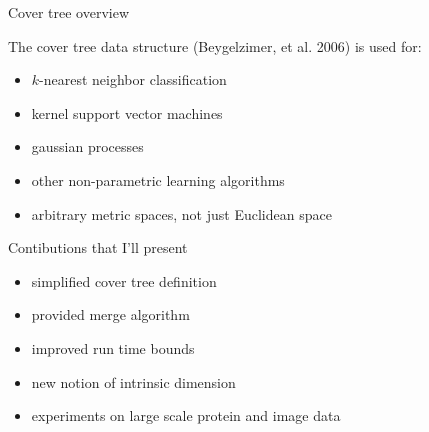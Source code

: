 \begin{frame}{Cover tree overview}


    The cover tree data structure (Beygelzimer, et al. 2006) is used for:
\begin{itemize}
    \item $k$-nearest neighbor classification
    \item kernel support vector machines
    \item gaussian processes
    \item other non-parametric learning algorithms
    \item arbitrary metric spaces, not just Euclidean space
\end{itemize}

\vspace{0.15in}
Contibutions that I'll present
    \begin{itemize}
        \item simplified cover tree definition
        \item provided merge algorithm
        \item improved run time bounds
        \item new notion of intrinsic dimension
        \item experiments on large scale protein and image data
    \end{itemize}
\end{frame}


